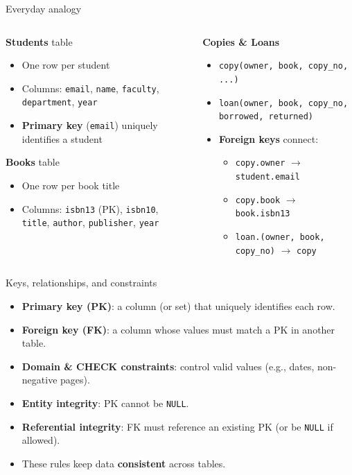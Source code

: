 \documentclass{beamer}
\begin{document}
\begin{frame}{Everyday analogy}
\begin{columns}[T,onlytextwidth]
\begin{column}{0.55\linewidth}
\textbf{Students} table
\begin{itemize}
  \item One row per student
  \item Columns: \texttt{email}, \texttt{name}, \texttt{faculty}, \texttt{department}, \texttt{year}
  \item \textbf{Primary key} (\texttt{email}) uniquely identifies a student
\end{itemize}
\medskip
\textbf{Books} table
\begin{itemize}
  \item One row per book title
  \item Columns: \texttt{isbn13} (PK), \texttt{isbn10}, \texttt{title}, \texttt{author}, \texttt{publisher}, \texttt{year}
\end{itemize}
\end{column}
\begin{column}{0.45\linewidth}
\textbf{Copies \& Loans}
\begin{itemize}
  \item \texttt{copy(owner, book, copy\_no, ...)}
  \item \texttt{loan(owner, book, copy\_no, borrowed, returned)}
  \item \textbf{Foreign keys} connect:
  \begin{itemize}
    \item \texttt{copy.owner} $\to$ \texttt{student.email}
    \item \texttt{copy.book} $\to$ \texttt{book.isbn13}
    \item \texttt{loan.(owner, book, copy\_no)} $\to$ \texttt{copy}
  \end{itemize}
\end{itemize}
\end{column}
\end{columns}
\end{frame}

\begin{frame}{Keys, relationships, and constraints}
\begin{itemize}
  \item \textbf{Primary key (PK)}: a column (or set) that uniquely identifies each row.
  \item \textbf{Foreign key (FK)}: a column whose values must match a PK in another table.
  \item \textbf{Domain \& CHECK constraints}: control valid values (e.g., dates, non-negative pages).
  \item \textbf{Entity integrity}: PK cannot be \texttt{NULL}.
  \item \textbf{Referential integrity}: FK must reference an existing PK (or be \texttt{NULL} if allowed).
  \item These rules keep data \textbf{consistent} across tables.
\end{itemize}
\end{frame}
\end{document}
